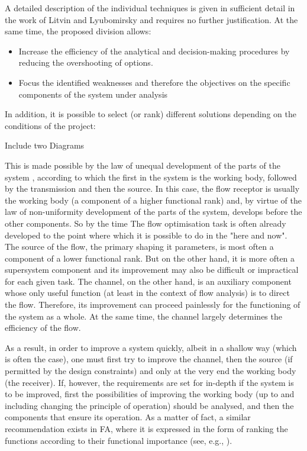 \documentclass[a4paper,11pt]{article}
\begin{document}
A detailed description of the individual techniques is given in sufficient
detail in the work of Litvin and Lyubomirsky and requires no further
justification. At the same time, the proposed division allows:
\begin{itemize}
\item Increase the efficiency of the analytical and decision-making procedures
  by reducing the overshooting of options.
\item Focus the identified weaknesses and therefore the objectives on the
  specific components of the system under analysis
\end{itemize}
In addition, it is possible to select (or rank) different solutions depending
on the conditions of the project:
\begin{center}
  Include two Diagrams
\end{center}

This is made possible by the law of unequal development of the parts of the
system \cite{B6}, according to which the first in the system is the working
body, followed by the transmission and then the source. In this case, the flow
receptor is usually the working body (a component of a higher functional rank)
and, by virtue of the law of non-uniformity development of the parts of the
system, develops before the other components. So by the time The flow
optimisation task is often already developed to the point where which it is
possible to do in the "here and now". The source of the flow, the primary
shaping it parameters, is most often a component of a lower functional rank.
But on the other hand, it is more often a supersystem component and its
improvement may also be difficult or impractical for each given task. The
channel, on the other hand, is an auxiliary component whose only useful
function (at least in the context of flow analysis) is to direct the flow.
Therefore, its improvement can proceed painlessly for the functioning of the
system as a whole. At the same time, the channel largely determines the
efficiency of the flow.

As a result, in order to improve a system quickly, albeit in a shallow way
(which is often the case), one must first try to improve the channel, then the
source (if permitted by the design constraints) and only at the very end the
working body (the receiver). If, however, the requirements are set for
in-depth if the system is to be improved, first the possibilities of improving
the working body (up to and including changing the principle of operation)
should be analysed, and then the components that ensure its operation. As a
matter of fact, a similar recommendation exists in FA, where it is expressed
in the form of ranking the functions according to their functional importance
(see, e.g., \cite{B16}).
\end{document}
